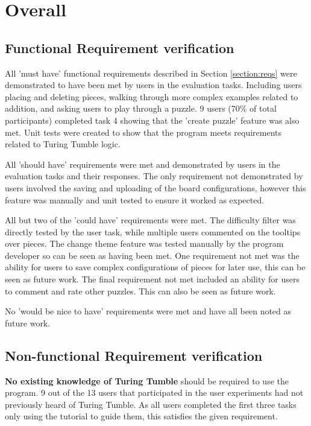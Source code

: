 \documentclass{l4proj}
\begin{document}
\section{Overall}
\subsection{Functional Requirement verification}

All 'must have' functional requirements described in Section \ref{section:reqs} were demonstrated to have been met by users in the evaluation tasks. Including users placing and deleting pieces, walking through more complex examples related to addition, and asking users to play through a puzzle. 9 users (70\% of total participants) completed task 4 showing that the 'create puzzle' feature was also met. Unit tests were created to show that the program meets requirements related to Turing Tumble logic.

All 'should have' requirements were met and demonstrated by users in the evaluation tasks and their responses. The only requirement not demonstrated by users involved the saving and uploading of the board configurations, however this feature was manually and unit tested to ensure it worked as expected. 

All but two of the 'could have' requirements were met. The difficulty filter was directly tested by the user task, while multiple users commented on the tooltips over pieces. The change theme feature was tested manually by the program developer so can be seen as having been met. One requirement not met was the ability for users to save complex configurations of pieces for later use, this can be seen as future work. The final requirement not met included an ability for users to comment and rate other puzzles. This can also be seen as future work. 

No 'would be nice to have' requirements were met and have all been noted as future work.

\subsection{Non-functional Requirement verification}
\textbf{No existing knowledge of Turing Tumble} should be required to use the program. 9 out of the 13 users that participated in the user experiments had not previously heard of Turing Tumble. As all users completed the first three tasks only using the tutorial to guide them, this satisfies the given requirement.
\end{document}
